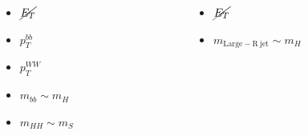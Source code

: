 \documentclass{beamer}
\newcommand*{\met}{\ensuremath{\cancel{E_{T}}}\xspace}
\newcommand*{\header}[1]{\fontsize{16}{8}\selectfont \textbf{{\color{MyPurple}{#1}}}}
\begin{document}
\begin{frame}
\begin{center}
\header{Signal Region}
\end{center}
\begin{columns}
\begin{column}{0.5\textwidth}
\begin{center}
\color{MyPurple}{Resolved}
\begin{itemize}
\item \met
\item $p_T^{bb}$
\item $p_T^{WW}$
\item $m_{bb}\sim{}m_H$
\item $m_{HH}\sim{}m_{S}$
\end{itemize}
\end{center}
\end{column}
\begin{column}{0.5\textwidth}
\begin{center}
\vspace{-1.4cm}\color{MyPurple}{Boosted}
\end{center}
\begin{itemize}
\item \met
\item $m_\mathrm{Large-R\ jet}\sim{}m_H$
\end{itemize}
\end{column}
\end{columns}
\end{frame}
\end{document}

